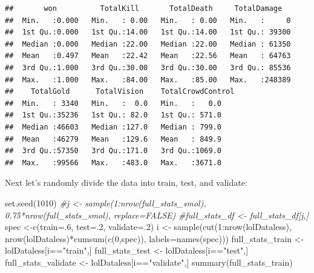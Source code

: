 \documentclass[
]{article}
\newenvironment{Shaded}{\begin{snugshade}}{\end{snugshade}}
\newcommand{\AttributeTok}[1]{\textcolor[rgb]{0.77,0.63,0.00}{#1}}
\newcommand{\CommentTok}[1]{\textcolor[rgb]{0.56,0.35,0.01}{\textit{#1}}}
\newcommand{\DecValTok}[1]{\textcolor[rgb]{0.00,0.00,0.81}{#1}}
\newcommand{\FunctionTok}[1]{\textcolor[rgb]{0.00,0.00,0.00}{#1}}
\newcommand{\NormalTok}[1]{#1}
\newcommand{\OtherTok}[1]{\textcolor[rgb]{0.56,0.35,0.01}{#1}}
\newcommand{\SpecialCharTok}[1]{\textcolor[rgb]{0.00,0.00,0.00}{#1}}
\newcommand{\StringTok}[1]{\textcolor[rgb]{0.31,0.60,0.02}{#1}}
\begin{document}
\begin{verbatim}
##       won          TotalKill       TotalDeath     TotalDamage    
##  Min.   :0.000   Min.   : 0.00   Min.   : 0.00   Min.   :     0  
##  1st Qu.:0.000   1st Qu.:14.00   1st Qu.:14.00   1st Qu.: 39300  
##  Median :0.000   Median :22.00   Median :22.00   Median : 61350  
##  Mean   :0.497   Mean   :22.42   Mean   :22.56   Mean   : 64763  
##  3rd Qu.:1.000   3rd Qu.:30.00   3rd Qu.:30.00   3rd Qu.: 85536  
##  Max.   :1.000   Max.   :84.00   Max.   :85.00   Max.   :248389  
##    TotalGold      TotalVision    TotalCrowdControl
##  Min.   : 3340   Min.   :  0.0   Min.   :   0.0   
##  1st Qu.:35236   1st Qu.: 82.0   1st Qu.: 571.0   
##  Median :46603   Median :127.0   Median : 799.0   
##  Mean   :46279   Mean   :129.6   Mean   : 849.9   
##  3rd Qu.:57350   3rd Qu.:171.0   3rd Qu.:1069.0   
##  Max.   :99566   Max.   :483.0   Max.   :3671.0
\end{verbatim}

Next let's randomly divide the data into train, test, and validate:

\begin{Shaded}
\begin{Highlighting}[]
\FunctionTok{set.seed}\NormalTok{(}\DecValTok{1010}\NormalTok{)}
\CommentTok{\#j \textless{}{-} sample(1:nrow(full\_stats\_smol), 0.75*nrow(full\_stats\_smol), replace=FALSE)}
\CommentTok{\#full\_stats\_df \textless{}{-} full\_stats\_df[j,]}
\NormalTok{spec }\OtherTok{\textless{}{-}}\FunctionTok{c}\NormalTok{(}\AttributeTok{train=}\NormalTok{.}\DecValTok{6}\NormalTok{, }\AttributeTok{test=}\NormalTok{.}\DecValTok{2}\NormalTok{, }\AttributeTok{validate=}\NormalTok{.}\DecValTok{2}\NormalTok{)}
\NormalTok{i }\OtherTok{\textless{}{-}} \FunctionTok{sample}\NormalTok{(}\FunctionTok{cut}\NormalTok{(}\DecValTok{1}\SpecialCharTok{:}\FunctionTok{nrow}\NormalTok{(lolDataless), }\FunctionTok{nrow}\NormalTok{(lolDataless)}\SpecialCharTok{*}\FunctionTok{cumsum}\NormalTok{(}\FunctionTok{c}\NormalTok{(}\DecValTok{0}\NormalTok{,spec)), }\AttributeTok{labels=}\FunctionTok{names}\NormalTok{(spec)))}
\NormalTok{full\_stats\_train }\OtherTok{\textless{}{-}}\NormalTok{ lolDataless[i}\SpecialCharTok{==}\StringTok{"train"}\NormalTok{,]}
\NormalTok{full\_stats\_test }\OtherTok{\textless{}{-}}\NormalTok{ lolDataless[i}\SpecialCharTok{==}\StringTok{"test"}\NormalTok{,]}
\NormalTok{full\_stats\_validate }\OtherTok{\textless{}{-}}\NormalTok{ lolDataless[i}\SpecialCharTok{==}\StringTok{"validate"}\NormalTok{,]}
\FunctionTok{summary}\NormalTok{(full\_stats\_train)}
\end{Highlighting}
\end{Shaded}
\end{document}
